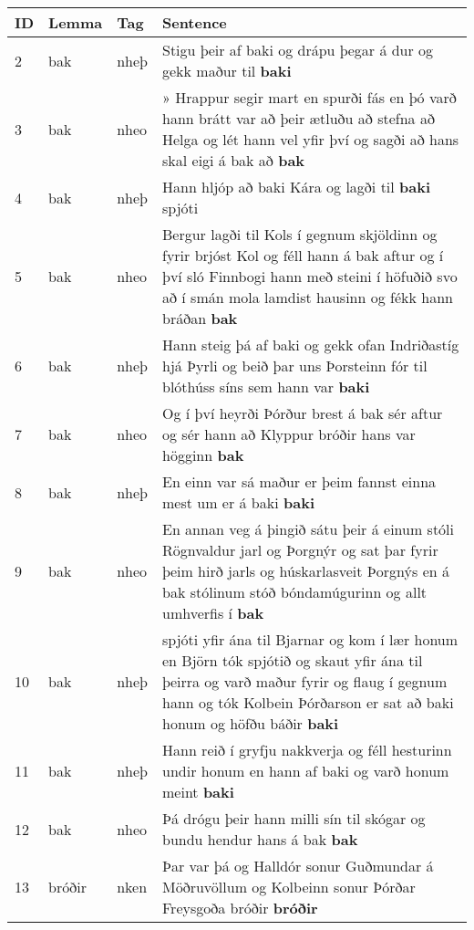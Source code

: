 \documentclass{article}
\date{}
\begin{document}
\maketitle
\noindent
\begin{longtable}{p{1cm}|p{1cm}|p{1cm}|p{13cm}}
ID&Lemma&Tag&Sentence\\
\hline
2&bak&nheþ&Stigu þeir af baki og drápu þegar á dur og gekk maður til \textbf{baki} \\
\hline
3&bak&nheo&» Hrappur segir mart en spurði fás en þó varð hann brátt var að þeir ætluðu að stefna að Helga og lét hann vel yfir því og sagði að hans skal eigi á bak að \textbf{bak} \\
\hline
4&bak&nheþ&Hann hljóp að baki Kára og lagði til \textbf{baki} spjóti\\
\hline
5&bak&nheo&Bergur lagði til Kols í gegnum skjöldinn og fyrir brjóst Kol og féll hann á bak aftur og í því sló Finnbogi hann með steini í höfuðið svo að í smán mola lamdist hausinn og fékk hann bráðan \textbf{bak} \\
\hline
6&bak&nheþ&Hann steig þá af baki og gekk ofan Indriðastíg hjá Þyrli og beið þar uns Þorsteinn fór til blóthúss síns sem hann var \textbf{baki} \\
\hline
7&bak&nheo&Og í því heyrði Þórður brest á bak sér aftur og sér hann að Klyppur bróðir hans var högginn \textbf{bak} \\
\hline
8&bak&nheþ&En einn var sá maður er þeim fannst einna mest um er á baki \textbf{baki} \\
\hline
9&bak&nheo&En annan veg á þingið sátu þeir á einum stóli Rögnvaldur jarl og Þorgnýr og sat þar fyrir þeim hirð jarls og húskarlasveit Þorgnýs en á bak stólinum stóð bóndamúgurinn og allt umhverfis í \textbf{bak} \\
\hline
10&bak&nheþ&spjóti yfir ána til Bjarnar og kom í lær honum en Björn tók spjótið og skaut yfir ána til þeirra og varð maður fyrir og flaug í gegnum hann og tók Kolbein Þórðarson er sat að baki honum og höfðu báðir \textbf{baki} \\
\hline
11&bak&nheþ&Hann reið í gryfju nakkverja og féll hesturinn undir honum en hann af baki og varð honum meint \textbf{baki} \\
\hline
12&bak&nheo&Þá drógu þeir hann milli sín til skógar og bundu hendur hans á bak \textbf{bak} \\
\hline
13&bróðir&nken&Þar var þá og Halldór sonur Guðmundar á Möðruvöllum og Kolbeinn sonur Þórðar Freysgoða bróðir \textbf{bróðir} \\
\hline

\end{longtable}
\end{document}
